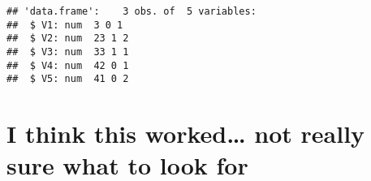 \documentclass[
]{article}
\begin{document}
\begin{verbatim}
## 'data.frame':    3 obs. of  5 variables:
##  $ V1: num  3 0 1
##  $ V2: num  23 1 2
##  $ V3: num  33 1 1
##  $ V4: num  42 0 1
##  $ V5: num  41 0 2
\end{verbatim}

\hypertarget{i-think-this-worked-not-really-sure-what-to-look-for}{%
\section{I think this worked\ldots{} not really sure what to look
for}\label{i-think-this-worked-not-really-sure-what-to-look-for}}
\end{document}

